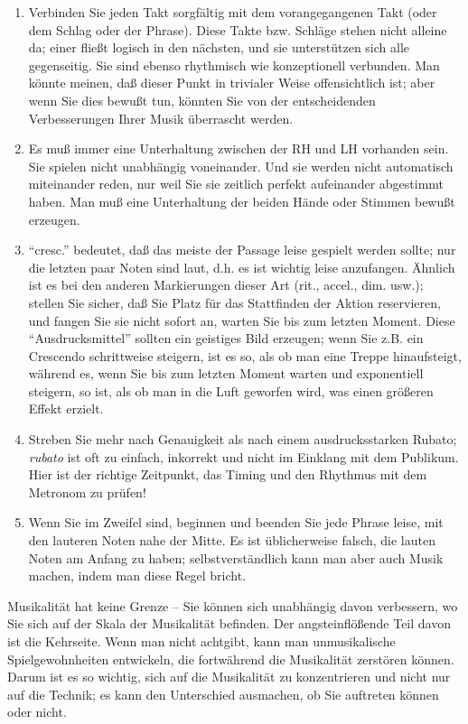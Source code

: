 \begin{enumerate}[label={\roman*.}] 
\item Verbinden Sie jeden Takt sorgfältig mit dem vorangegangenen Takt (oder dem Schlag oder der Phrase).
Diese Takte bzw. Schläge stehen nicht alleine da; einer fließt logisch in den nächsten, und sie unterstützen sich alle gegenseitig.
Sie sind ebenso rhythmisch wie konzeptionell verbunden.
Man könnte meinen, daß dieser Punkt in trivialer Weise offensichtlich ist; aber wenn Sie dies bewußt tun, könnten Sie von der entscheidenden Verbesserungen Ihrer Musik überrascht werden.

\item Es muß immer eine Unterhaltung zwischen der RH und LH vorhanden sein.
Sie spielen nicht unabhängig voneinander.
Und sie werden nicht automatisch miteinander reden, nur weil Sie sie zeitlich perfekt aufeinander abgestimmt haben.
Man muß eine Unterhaltung der beiden Hände oder Stimmen bewußt erzeugen.

\item \enquote{cresc.} bedeutet, daß das meiste der Passage leise gespielt werden sollte; nur die letzten paar Noten sind laut, d.h. es ist wichtig leise anzufangen.
Ähnlich ist es bei den anderen Markierungen dieser Art (rit., accel., dim. usw.); stellen Sie sicher, daß Sie Platz für das Stattfinden der Aktion reservieren, und fangen Sie sie nicht sofort an, warten Sie bis zum letzten Moment.
Diese \enquote{Ausdrucksmittel} sollten ein geistiges Bild erzeugen; wenn Sie z.B. ein Crescendo schrittweise steigern, ist es so, als ob man eine Treppe hinaufsteigt, während es, wenn Sie bis zum letzten Moment warten und exponentiell steigern, so ist, als ob man in die Luft geworfen wird, was einen größeren Effekt erzielt.


\item Streben Sie mehr nach Genauigkeit als nach einem ausdrucksstarken Rubato; \textit{rubato} ist oft zu einfach, inkorrekt und nicht im Einklang mit dem Publikum.
Hier ist der richtige Zeitpunkt, das Timing und den Rhythmus mit dem Metronom zu prüfen!

\item Wenn Sie im Zweifel sind, beginnen und beenden Sie jede Phrase leise, mit den lauteren Noten nahe der Mitte.
Es ist üblicherweise falsch, die lauten Noten am Anfang zu haben; selbstverständlich kann man aber auch Musik machen, indem man diese Regel bricht.

\end{enumerate}
Musikalität hat keine Grenze -- Sie können sich unabhängig davon verbessern, wo Sie sich auf der Skala der Musikalität befinden.
Der angsteinflößende Teil davon ist die Kehrseite.
Wenn man nicht achtgibt, kann man unmusikalische Spielgewohnheiten entwickeln, die fortwährend die Musikalität zerstören können.
Darum ist es so wichtig, sich auf die Musikalität zu konzentrieren und nicht nur auf die Technik; es kann den Unterschied ausmachen, ob Sie auftreten können oder nicht.

